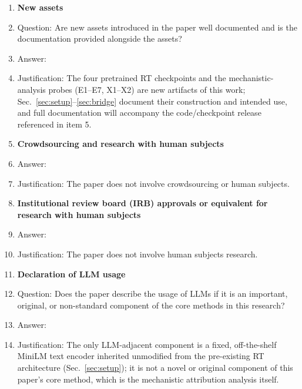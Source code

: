 \begin{enumerate}
\item {\bf New assets}
    \item[] Question: Are new assets introduced in the paper well documented and is the documentation provided alongside the assets?
    \item[] Answer: \answerYes{}
    \item[] Justification: The four pretrained RT checkpoints and the mechanistic-analysis probes (E1--E7, X1--X2) are new artifacts of this work; Sec.~\ref{sec:setup}--\ref{sec:bridge} document their construction and intended use, and full documentation will accompany the code/checkpoint release referenced in item 5.

\item {\bf Crowdsourcing and research with human subjects}
    \item[] Answer: \answerNA{}
    \item[] Justification: The paper does not involve crowdsourcing or human subjects.

\item {\bf Institutional review board (IRB) approvals or equivalent for research with human subjects}
    \item[] Answer: \answerNA{}
    \item[] Justification: The paper does not involve human subjects research.

\item {\bf Declaration of LLM usage}
    \item[] Question: Does the paper describe the usage of LLMs if it is an important, original, or non-standard component of the core methods in this research?
    \item[] Answer: \answerNA{}
    \item[] Justification: The only LLM-adjacent component is a fixed, off-the-shelf MiniLM text encoder inherited unmodified from the pre-existing RT architecture (Sec.~\ref{sec:setup}); it is not a novel or original component of this paper's core method, which is the mechanistic attribution analysis itself.

\end{enumerate}
